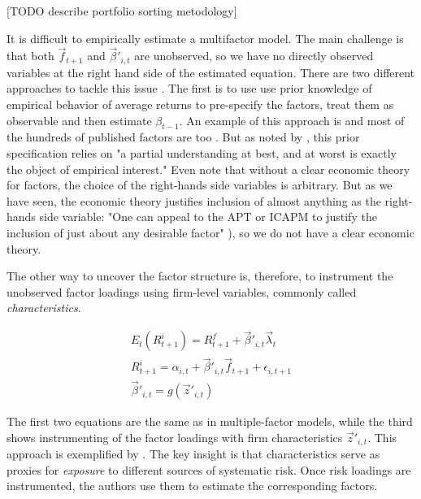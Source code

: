 			[TODO describe portfolio sorting metodology]
			
			It is difficult to empirically estimate a multifactor model. The main challenge is that both $\vec{f}_{t+1}$ and $\vec{\beta}'_{i,t}$ are unobserved, so we have no directly observed variables at the right hand side of the estimated equation. There are two different approaches to tackle this issue \citep{kelly2019characteristics}. The first is to use use prior knowledge of empirical behavior of average returns to pre-specify the factors, treat them as observable and then estimate $\beta_{t-1}$. An example of this approach is \citep{fama1993common} and most of the hundreds of published factors are too \cite{cochrane2009asset}. But as noted by \cite[p.~3]{kelly2019characteristics}, this prior specification relies on "a partial understanding at best, and at worst is exactly the object of empirical interest."  Even \cite{fama1993common} note that without a clear economic theory for factors, the choice of the right-hands side variables is arbitrary. But as we have seen, the economic theory justifies inclusion of almost anything as the right-hands side variable: "One can appeal to the APT or ICAPM to justify the inclusion of just about any desirable factor" \citep[p.~124]{cochrane2009asset}), so we do not have a clear economic theory.  
			
			The other way to uncover the factor structure is, therefore, to instrument the unobserved factor loadings using firm-level variables, commonly called \textit{characteristics}.  
			
			\begin{align}
				E_t(R^i_{t+1}) = R^f_{t+1} + \vec{\beta}'_{i,t} \vec{\lambda}_{t}  \label{ER_betalambda} \\
				R^i_{t+1} = \alpha_{i,t} + \vec{\beta}'_{i,t} \vec{f}_{t+1} + \epsilon_{i,t+1} \\
				\vec{\beta}'_{i,t} = g(\vec{z}'_{i,t}) \label{instrumented_betas}
			\end{align}
			
			The first two equations are the same as in multiple-factor models, while the third shows instrumenting of the factor loadings with firm characteristics $\vec{z}'_{i,t}$. This approach is exemplified by \cite{kelly2019characteristics}. The key insight is that characteristics serve as proxies for \textit{exposure} to different sources of systematic risk. Once risk loadings are instrumented, the authors use them to estimate the corresponding factors.
	
	
